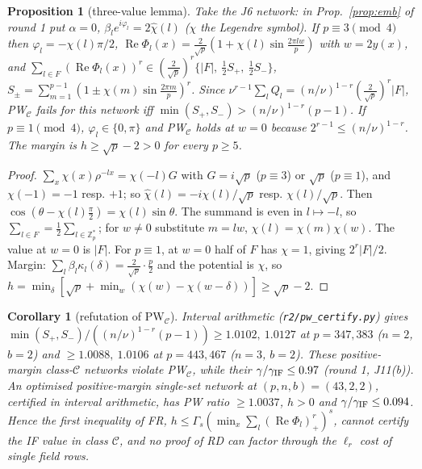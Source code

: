 \documentclass[11pt]{article}
\newtheorem{proposition}[theorem]{Proposition}
\newtheorem{corollary}[theorem]{Corollary}
\theoremstyle{remark}
\renewcommand{\Re}{\operatorname{Re}}
\begin{document}
\begin{proposition}[three-value lemma]\label{prop:leg}
Take the J6 network: in Prop.~\ref{prop:emb} of round 1 put $\alpha=0$, $\beta_le^{i\varphi_l}=2\widehat\chi(l)$ ($\chi$ the Legendre symbol).
If $p\equiv3\pmod4$ then $\varphi_l=-\chi(l)\pi/2$, $\Re\Phi_l(x)=\frac2{\sqrt p}(1+\chi(l)\sin\frac{2\pi lw}p)$ with $w=2y(x)$, and
$\sum_{l\in F}(\Re\Phi_l(x))^r\in(\tfrac2{\sqrt p})^r\{|F|,\ \tfrac12S_+,\ \tfrac12S_-\}$,
$S_\pm=\sum_{m=1}^{p-1}(1\pm\chi(m)\sin\frac{2\pi m}p)^r$. Since $\nu^{r-1}\sum_lQ_l=(n/\nu)^{1-r}(\frac2{\sqrt p})^r|F|$, PW$_{\mathcal C}$ fails for this
network iff $\min(S_+,S_-)>(n/\nu)^{1-r}(p-1)$. If $p\equiv1\pmod4$, $\varphi_l\in\{0,\pi\}$ and PW$_{\mathcal C}$ holds at $w=0$ because
$2^{r-1}\le(n/\nu)^{1-r}$. The margin is $h\ge\sqrt p-2>0$ for every $p\ge5$.
\end{proposition}
\begin{proof}
$\sum_x\chi(x)\rho^{-lx}=\chi(-l)G$ with $G=i\sqrt p$ ($p\equiv3$) or $\sqrt p$ ($p\equiv1$), and $\chi(-1)=-1$ resp. $+1$; so
$\widehat\chi(l)=-i\chi(l)/\sqrt p$ resp. $\chi(l)/\sqrt p$. Then $\cos(\theta-\chi(l)\frac\pi2)=\chi(l)\sin\theta$. The summand is even in
$l\mapsto-l$, so $\sum_{l\in F}=\frac12\sum_{l\in\mathbb Z_p^*}$; for $w\ne0$ substitute $m=lw$, $\chi(l)=\chi(m)\chi(w)$. The value at $w=0$ is $|F|$.
For $p\equiv1$, at $w=0$ half of $F$ has $\chi=1$, giving $2^r|F|/2$. Margin: $\sum_l\beta_l\kappa_l(\delta)=\frac2{\sqrt p}\cdot\frac p2$ and the
potential is $\chi$, so $h=\min_\delta[\sqrt p+\min_w(\chi(w)-\chi(w-\delta))]\ge\sqrt p-2$.
\end{proof}

\begin{corollary}[refutation of PW$_{\mathcal C}$]
Interval arithmetic (\texttt{r2/pw\_certify.py}) gives $\min(S_+,S_-)/((n/\nu)^{1-r}(p-1))\ge1.0102,\ 1.0127$ at $p=347,383$ ($n=2$, $b=2$) and
$\ge1.0088,\ 1.0106$ at $p=443,467$ ($n=3$, $b=2$). These positive-margin class-$\mathcal C$ networks violate PW$_{\mathcal C}$, while their
$\gamma/\gamma_{\rm IF}\le0.97$ (round 1, J11(b)). An optimised positive-margin single-set network at $(p,n,b)=(43,2,2)$, certified in interval
arithmetic, has PW ratio $\ge1.0037$, $h>0$ and $\gamma/\gamma_{\rm IF}\le0.094$. Hence the first inequality of FR,
$h\le\Gamma_s(\min_x\sum_l(\Re\Phi_l)_+^r)^s$, cannot certify the IF value in class $\mathcal C$, and no proof of RD can factor through the
$\ell_r$ cost of single field rows.
\end{corollary}
\end{document}
